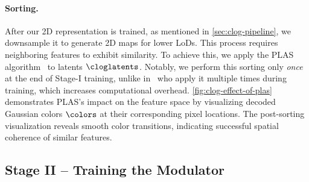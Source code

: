     \paragraph{Sorting.}
      After our 2D representation is trained, as mentioned in
      \cref{sec:clog-pipeline}, we downsample it to generate 2D maps for lower
      LoDs.
      This process requires neighboring features to exhibit similarity.
      To achieve this, we apply the PLAS
      algorithm~\cite{morgenstern2024compact} to latents $\cloglatents$.
      Notably, we perform this sorting only \emph{once} at the end of Stage-I
      training, unlike in~\cite{morgenstern2024compact} who apply it multiple
      times during training, which increases computational overhead.
      \cref{fig:clog-effect-of-plas} demonstrates PLAS's impact on the feature space by visualizing decoded Gaussian colors $\colors$ at their corresponding pixel locations.
      The post-sorting visualization reveals smooth color transitions,
      indicating successful spatial coherence of similar features.

      
  \subsection{Stage II -- Training the Modulator}

